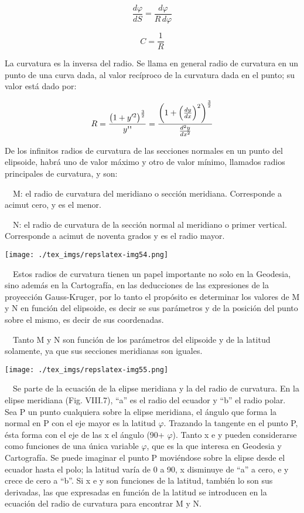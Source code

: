 \documentclass[]{article}
\begin{document}
\[\frac{d\varphi}{dS}=\frac{d\varphi}{R\,d\varphi}\]

\[C=\frac{1}{R}\]

La curvatura es la inversa del radio. Se llama en general radio de
curvatura en un punto de una curva dada, al valor recíproco de la
curvatura dada en el punto; su valor está dado por:

\[{R=\frac{\left(1+y'^{{2}}\right)^{{\frac{3}{2}}}}{y\text{{\textquotesingle}{\textquotesingle}}}=\frac{\left(1+\left(\frac{dy}{dx}\right)^{{2}}\right)^{{\frac{3}{2}}}}{\frac{d^{{2}}y}{dx^{{2}}}}}\]

De los infinitos radios de curvatura de las secciones normales en un
punto del elipsoide, habrá uno de valor máximo y otro de valor mínimo,
llamados radios principales de curvatura, y son:

~~M: el radio de curvatura del meridiano o sección meridiana.
Corresponde a acimut cero, y es el menor.

~~N: el radio de curvatura de la sección normal al meridiano o primer
vertical. Corresponde a acimut de noventa grados y es el radio mayor.

\texttt{[image: ./tex\_imgs/repslatex-img54.png]}

~~Estos radios de curvatura tienen un papel importante no solo en la
Geodesia, sino además en la Cartografía, en las deducciones de las
expresiones de la proyección Gauss-Kruger, por lo tanto el propósito es
determinar los valores de M y N en función del elipsoide, es decir se
sus parámetros y de la posición del punto sobre el mismo, es decir de
sus coordenadas.

~~Tanto M y N son función de los parámetros del elipsoide y de la
latitud solamente, ya que sus secciones meridianas son iguales.

\texttt{[image: ./tex\_imgs/repslatex-img55.png]}

~~Se parte de la ecuación de la elipse meridiana y la del radio de
curvatura. En la elipse meridiana (Fig. VIII.7), ``a'' es el radio del
ecuador y ``b'' el radio polar. Sea P un punto cualquiera sobre la
elipse meridiana, el ángulo que forma la normal en P con el eje mayor es
la latitud \({\varphi }\). Trazando la tangente en el punto P, ésta
forma con el eje de las x el ángulo (90+ \({\varphi }\)). Tanto x e y
pueden considerarse como funciones de una única variable \({\varphi }\),
que es la que interesa en Geodesia y Cartografía. Se puede imaginar el
punto P moviéndose sobre la elipse desde el ecuador hasta el polo; la
latitud varía de 0 a 90, x disminuye de ``a'' a cero, e y crece de cero
a ``b''. Si x e y son funciones de la latitud, también lo son sus
derivadas, las que expresadas en función de la latitud se introducen en
la ecuación del radio de curvatura para encontrar M y N.
\end{document}
